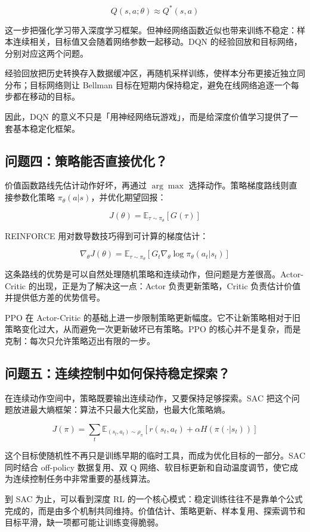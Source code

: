\documentclass{article}
\begin{document}
\[
Q(s,a;\theta) \approx Q^*(s,a)
\]

这一步把强化学习带入深度学习框架。但神经网络函数近似也带来训练不稳定：样本连续相关，目标值又会随着网络参数一起移动。DQN 的经验回放和目标网络，分别对应这两个问题。

经验回放把历史转换存入数据缓冲区，再随机采样训练，使样本分布更接近独立同分布；目标网络则让 Bellman 目标在短期内保持稳定，避免在线网络追逐一个每步都在移动的目标。

因此，DQN 的意义不只是「用神经网络玩游戏」，而是给深度价值学习提供了一套基本稳定化框架。

\subsection*{问题四：策略能否直接优化？}

价值函数路线先估计动作好坏，再通过 $\arg\max$ 选择动作。策略梯度路线则直接参数化策略 $\pi_\theta(a|s)$，并优化期望回报：

\[
J(\theta)=\mathbb{E}_{\tau\sim\pi_\theta}[G(\tau)]
\]

REINFORCE 用对数导数技巧得到可计算的梯度估计：

\[
\nabla_\theta J(\theta)
=
\mathbb{E}_{\tau\sim\pi_\theta}
\left[
G_t \nabla_\theta \log \pi_\theta(a_t|s_t)
\right]
\]

这条路线的优势是可以自然处理随机策略和连续动作，但问题是方差很高。Actor-Critic 的出现，正是为了解决这一点：Actor 负责更新策略，Critic 负责估计价值并提供低方差的优势信号。

PPO 在 Actor-Critic 的基础上进一步限制策略更新幅度。它不让新策略相对于旧策略变化过大，从而避免一次更新破坏已有策略。PPO 的核心并不是复杂，而是克制：每次只允许策略迈出有限的一步。

\subsection*{问题五：连续控制中如何保持稳定探索？}

在连续动作空间中，策略既要输出连续动作，又要保持足够探索。SAC 把这个问题放进最大熵框架：算法不只最大化奖励，也最大化策略熵。

\[
J(\pi) =
\sum_t
\mathbb{E}_{(s_t,a_t)\sim\rho_\pi}
\left[
r(s_t,a_t)
+ \alpha H(\pi(\cdot|s_t))
\right]
\]

这个目标使随机性不再只是训练早期的临时工具，而成为优化目标的一部分。SAC 同时结合 off-policy 数据复用、双 Q 网络、软目标更新和自动温度调节，使它成为连续控制任务中非常重要的基线算法。

到 SAC 为止，可以看到深度 RL 的一个核心模式：稳定训练往往不是靠单个公式完成的，而是由多个机制共同维持。价值估计、策略更新、样本复用、探索调节和目标平滑，缺一项都可能让训练变得脆弱。
\end{document}
